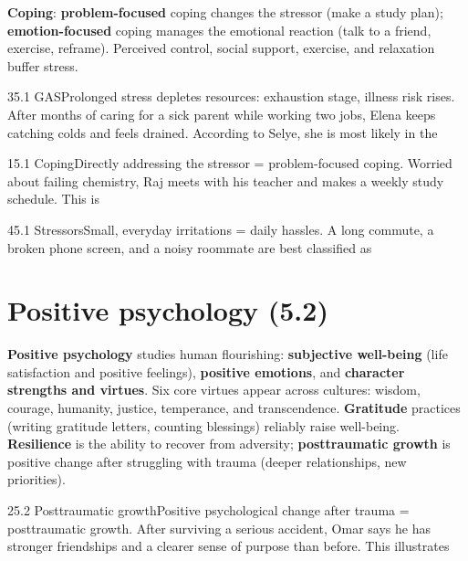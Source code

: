 \documentclass[11pt]{article}
\begin{document}
\textbf{Coping}: \textbf{problem-focused} coping changes the stressor (make a study plan); \textbf{emotion-focused} coping manages the emotional reaction (talk to a friend, exercise, reframe). Perceived control, social support, exercise, and relaxation buffer stress.

\begin{q}{3}{5.1 GAS}{Prolonged stress depletes resources: exhaustion stage, illness risk rises.}
After months of caring for a sick parent while working two jobs, Elena keeps catching colds and feels drained. According to Selye, she is most likely in the
\end{q}

\begin{q}{1}{5.1 Coping}{Directly addressing the stressor = problem-focused coping.}
Worried about failing chemistry, Raj meets with his teacher and makes a weekly study schedule. This is
\end{q}

\begin{q}{4}{5.1 Stressors}{Small, everyday irritations = daily hassles.}
A long commute, a broken phone screen, and a noisy roommate are best classified as
\end{q}

\section{Positive psychology (5.2)}

\textbf{Positive psychology} studies human flourishing: \textbf{subjective well-being} (life satisfaction and positive feelings), \textbf{positive emotions}, and \textbf{character strengths and virtues}. Six core virtues appear across cultures: wisdom, courage, humanity, justice, temperance, and transcendence. \textbf{Gratitude} practices (writing gratitude letters, counting blessings) reliably raise well-being. \textbf{Resilience} is the ability to recover from adversity; \textbf{posttraumatic growth} is positive change after struggling with trauma (deeper relationships, new priorities).

\begin{q}{2}{5.2 Posttraumatic growth}{Positive psychological change after trauma = posttraumatic growth.}
After surviving a serious accident, Omar says he has stronger friendships and a clearer sense of purpose than before. This illustrates
\end{q}
\end{document}
